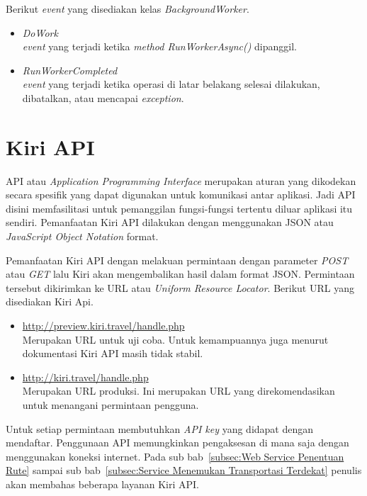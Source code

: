 Berikut \textit{event} yang disediakan kelas \textit{BackgroundWorker}.
\begin{itemize}
	\item \textit{DoWork} \\
	\textit{event} yang terjadi ketika \textit{method RunWorkerAsync()} dipanggil.
	\item \textit{RunWorkerCompleted} \\
	\textit{event} yang terjadi ketika operasi di latar belakang selesai dilakukan, dibatalkan, atau mencapai \textit{exception}.
\end{itemize}

\section{Kiri API}
\label{sec:Kiri API}
\hspace{0.5cm} API atau \textit{Application Programming Interface} merupakan aturan yang dikodekan secara spesifik yang dapat digunakan untuk komunikasi antar aplikasi. Jadi API disini memfasilitasi untuk pemanggilan fungsi-fungsi tertentu diluar aplikasi itu sendiri. Pemanfaatan Kiri API dilakukan dengan menggunakan JSON atau \textit{JavaScript Object Notation} format. 

Pemanfaatan Kiri API dengan melakuan permintaan dengan parameter \textit{POST} atau \textit{GET} lalu Kiri akan mengembalikan hasil dalam format JSON. Permintaan tersebut dikirimkan ke URL atau \textit{Uniform Resource Locator}. Berikut URL yang disediakan Kiri Api.
\begin{itemize}
	\item \url{http://preview.kiri.travel/handle.php} \\
	Merupakan URL untuk uji coba. Untuk kemampuannya juga menurut dokumentasi Kiri API masih tidak stabil.
	\item \url{http://kiri.travel/handle.php} \\
	Merupakan URL produksi. Ini merupakan URL yang direkomendasikan untuk menangani permintaan pengguna.
\end{itemize}
Untuk setiap permintaan membutuhkan \textit{API key} yang didapat dengan mendaftar\cite{Kiri}. Penggunaan API memungkinkan pengaksesan di mana saja dengan menggunakan koneksi internet. Pada sub bab~\ref{subsec:Web Service Penentuan Rute} sampai sub bab~\ref{subsec:Service Menemukan Transportasi Terdekat} penulis akan membahas beberapa layanan Kiri API.

